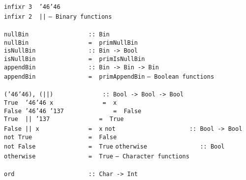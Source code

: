 \mbox{\tt infixr\ 3\ \ {\char'46}{\char'46}}\\
\mbox{\tt infixr\ 2\ \ ||}
%
%
%
%
%
\eprogB\noindent\bprogB
\mbox{\tt --\ Binary\ functions}\\
\mbox{\tt }\\[-8pt]
\mbox{\tt nullBin\ \ \ \ \ \ \ \ \ \ \ \ \ \ \ \ \ ::\ Bin}\\
\mbox{\tt nullBin\ \ \ \ \ \ \ \ \ \ \ \ \ \ \ \ \ =\ \ primNullBin}
%
\eprogB\noindent\bprogB
\mbox{\tt isNullBin\ \ \ \ \ \ \ \ \ \ \ \ \ \ \ ::\ Bin\ ->\ Bool}\\
\mbox{\tt isNullBin\ \ \ \ \ \ \ \ \ \ \ \ \ \ \ =\ \ primIsNullBin}
%
\eprogB\noindent\bprogB
\mbox{\tt appendBin\ \ \ \ \ \ \ \ \ \ \ \ \ \ \ ::\ Bin\ ->\ Bin\ ->\ Bin}\\
\mbox{\tt appendBin\ \ \ \ \ \ \ \ \ \ \ \ \ \ \ =\ \ primAppendBin}
%
\eprogB\noindent\bprogB
\mbox{\tt --\ Boolean\ functions}\\
\mbox{\tt }\\[-8pt]
\mbox{\tt ({\char'46}{\char'46}),\ (||)\ \ \ \ \ \ \ \ \ \ \ \ \ \ ::\ Bool\ ->\ Bool\ ->\ Bool}\\
\mbox{\tt True\ \ {\char'46}{\char'46}\ x\ \ \ \ \ \ \ \ \ \ \ \ \ \ =\ \ x}\\
\mbox{\tt False\ {\char'46}{\char'46}\ {\char'137}\ \ \ \ \ \ \ \ \ \ \ \ \ \ =\ \ False}\\
\mbox{\tt True\ \ ||\ {\char'137}\ \ \ \ \ \ \ \ \ \ \ \ \ \ =\ \ True}\\
\mbox{\tt False\ ||\ x\ \ \ \ \ \ \ \ \ \ \ \ \ \ =\ \ x}
%
%
\eprogB\noindent\bprogB
\mbox{\tt not\ \ \ \ \ \ \ \ \ \ \ \ \ \ \ \ \ \ \ \ \ ::\ Bool\ ->\ Bool}\\
\mbox{\tt not\ True\ \ \ \ \ \ \ \ \ \ \ \ \ \ \ \ =\ \ False}\\
\mbox{\tt not\ False\ \ \ \ \ \ \ \ \ \ \ \ \ \ \ =\ \ True}
%
\eprogB\noindent\bprogB
\mbox{\tt otherwise\ \ \ \ \ \ \ \ \ \ \ \ \ \ \ ::\ Bool}\\
\mbox{\tt otherwise\ \ \ \ \ \ \ \ \ \ \ \ \ \ \ =\ \ True}
%
\eprogB\noindent\bprogB
\mbox{\tt --\ Character\ functions}\\
\mbox{\tt }\\[-8pt]
\mbox{\tt ord\ \ \ \ \ \ \ \ \ \ \ \ \ \ \ \ \ \ \ \ \ ::\ Char\ ->\ Int}\\
